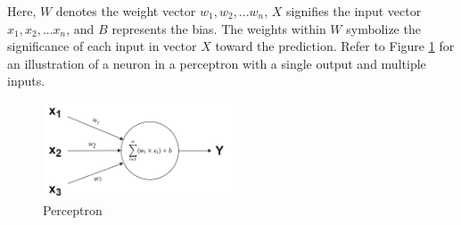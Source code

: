 \documentclass[12pt,twoside,a4paper,parskip]{scrbook} %
\begin{document}
Here, \(W\) denotes the weight vector \(w_1, w_2, ... w_n\), \(X\) signifies the input vector \(x_1, x_2, ... x_n\), and \(B\) represents the bias. The weights within \(W\) symbolize the significance of each input in vector \(X\) toward the prediction. Refer to Figure \ref{fig:Perceptron} for an illustration of a neuron in a perceptron with a single output and multiple inputs.
\begin{figure}[h]
    \centering
    \includegraphics[width=0.5\textwidth]{Images/perceptron.png}
    \caption{Perceptron}
    \label{fig:Perceptron}
  \end{figure}
\end{document}
